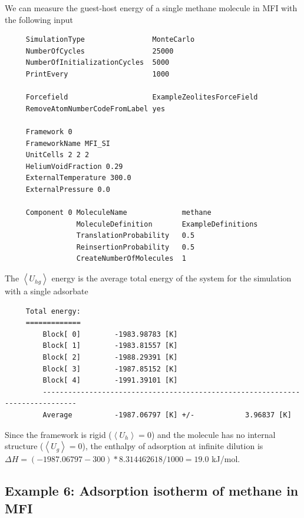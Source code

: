 \noindent
We can measure the guest-host energy of a single methane molecule in MFI with the following input
\begin{tiny}
\begin{verbatim}
     SimulationType                MonteCarlo
     NumberOfCycles                25000
     NumberOfInitializationCycles  5000
     PrintEvery                    1000
     
     Forcefield                    ExampleZeolitesForceField
     RemoveAtomNumberCodeFromLabel yes
     
     Framework 0
     FrameworkName MFI_SI
     UnitCells 2 2 2
     HeliumVoidFraction 0.29
     ExternalTemperature 300.0
     ExternalPressure 0.0
     
     Component 0 MoleculeName             methane
                 MoleculeDefinition       ExampleDefinitions
                 TranslationProbability   0.5
                 ReinsertionProbability   0.5
                 CreateNumberOfMolecules  1
\end{verbatim}
\end{tiny}

\noindent
The $\left\langle U_{hg}\right\rangle$ energy is the average total energy of the system for the simulation with a single adsorbate
\begin{tiny}
\begin{verbatim}
     Total energy:
     =============
         Block[ 0]        -1983.98783 [K]
         Block[ 1]        -1983.81557 [K]
         Block[ 2]        -1988.29391 [K]
         Block[ 3]        -1987.85152 [K]
         Block[ 4]        -1991.39101 [K]
         ------------------------------------------------------------------------------
         Average          -1987.06797 [K] +/-            3.96837 [K]
\end{verbatim}
\end{tiny}
Since the framework is rigid ($\left\langle U_{h}\right\rangle=0$) and the molecule has no internal structure
($\left\langle U_{g}\right\rangle=0$), the enthalpy of adsorption at infinite dilution is
$\Delta H = (-1987.06797-300)*8.314462618/1000=19.0$ kJ/mol.


\subsection*{Example 6: Adsorption isotherm of methane in MFI}

